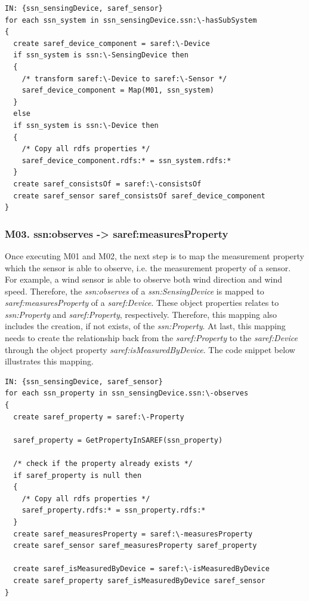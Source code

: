 \documentclass{sig-alternate-05-2015}
\begin{document}
\begin{lstlisting}[caption={Pseudocode snippet for M02},label={code:sample}]
IN: {ssn_sensingDevice, saref_sensor}
for each ssn_system in ssn_sensingDevice.ssn:\-hasSubSystem 
{ 
  create saref_device_component = saref:\-Device 
  if ssn_system is ssn:\-SensingDevice then 
  { 
    /* transform saref:\-Device to saref:\-Sensor */
    saref_device_component = Map(M01, ssn_system) 
  } 
  else 
  if ssn_system is ssn:\-Device then 
  { 
    /* Copy all rdfs properties */ 
    saref_device_component.rdfs:* = ssn_system.rdfs:* 
  } 
  create saref_consistsOf = saref:\-consistsOf 
  create saref_sensor saref_consistsOf saref_device_component 
}
\end{lstlisting}

\subsubsection{M03. ssn:\-observes -> saref:\-measuresProperty}
Once executing M01 and M02, the next step is to map the measurement property which the sensor is able to observe, i.e. the measurement property of a sensor. For example, a wind sensor is able to observe both wind direction and wind speed. Therefore, the \textit{ssn:\-observes} of a \textit{ssn:\-SensingDevice} is mapped to \textit{saref:\-measuresProperty} of a \textit{saref:\-Device}. These object properties relates to \textit{ssn:\-Property} and \textit{saref:\-Property}, respectively. Therefore, this mapping also includes the creation, if not exists, of the \textit{ssn:\-Property}. At last, this mapping needs to create the relationship back from the \textit{saref:\-Property} to the \textit{saref:\-Device} through the object property \textit{saref:\-isMeasuredByDevice}. The code snippet below illustrates this mapping. 

\begin{lstlisting}[caption={Pseudocode snippet for M03},label={code:sample}]
IN: {ssn_sensingDevice, saref_sensor}
for each ssn_property in ssn_sensingDevice.ssn:\-observes 
{ 
  create saref_property = saref:\-Property 
  
  saref_property = GetPropertyInSAREF(ssn_property)
    
  /* check if the property already exists */
  if saref_property is null then 
  { 
    /* Copy all rdfs properties */ 
    saref_property.rdfs:* = ssn_property.rdfs:* 
  } 
  create saref_measuresProperty = saref:\-measuresProperty 
  create saref_sensor saref_measuresProperty saref_property 
  
  create saref_isMeasuredByDevice = saref:\-isMeasuredByDevice
  create saref_property saref_isMeasuredByDevice saref_sensor
}
\end{lstlisting}
\end{document}
